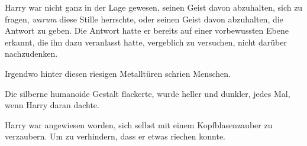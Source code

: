 Harry war nicht ganz in der Lage gewesen, seinen Geist davon abzuhalten, sich zu fragen, \emph{warum} diese Stille herrschte, oder seinen Geist davon abzuhalten, die Antwort zu geben. Die Antwort hatte er bereits auf einer vorbewussten Ebene erkannt, die ihn dazu veranlasst hatte, vergeblich zu versuchen, nicht darüber nachzudenken.

Irgendwo hinter diesen riesigen Metalltüren schrien Menschen.

Die silberne humanoide Gestalt flackerte, wurde heller und dunkler, jedes Mal, wenn Harry daran dachte.

Harry war angewiesen worden, sich selbst mit einem Kopfblasenzauber zu verzaubern. Um zu verhindern, dass er etwas riechen konnte.

